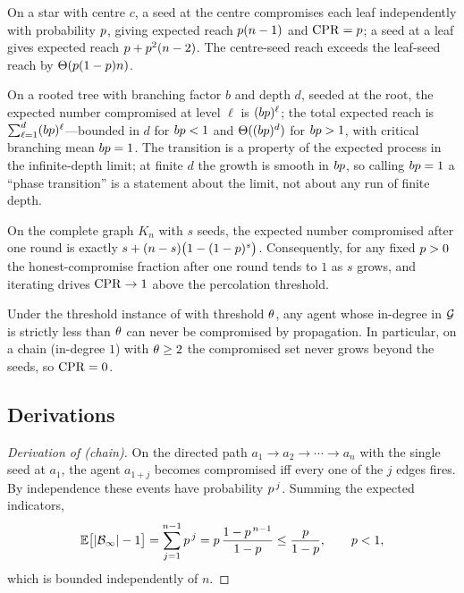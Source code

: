 \begin{proposition}\label{prop:star}
On a star with centre $c$, a seed at the centre compromises each leaf independently with
probability $p$, giving expected reach $p(n-1)$ and $\mathrm{CPR}=p$; a seed at a
leaf gives expected reach $p+p^{2}(n-2)$. The centre-seed reach exceeds the
leaf-seed reach by $\Theta(p(1-p)n)$.
\end{proposition}

\begin{proposition}\label{prop:tree}
On a rooted tree with branching factor $b$ and depth $d$, seeded at the root, the expected
number compromised at level $\ell$ is $(bp)^{\ell}$; the total expected reach is
$\sum_{\ell=1}^{d}(bp)^{\ell}$---bounded in $d$ for $bp<1$ and
$\Theta((bp)^{d})$ for $bp>1$, with critical branching mean $bp=1$. The
transition is a property of the expected process in the infinite-depth limit; at finite $d$
the growth is smooth in $bp$, so calling $bp=1$ a ``phase transition'' is a
statement about the limit, not about any run of finite depth.
\end{proposition}

\begin{proposition}\label{prop:mesh}
On the complete graph $K_n$ with $s$ seeds, the expected number compromised after one
round is exactly $s+(n-s)\bigl(1-(1-p)^{s}\bigr)$. Consequently, for any fixed
$p>0$ the honest-compromise fraction after one round tends to $1$ as $s$ grows, and
iterating drives $\mathrm{CPR}\to1$ above the percolation threshold.
\end{proposition}

\begin{corollary}\label{cor:threshold}
Under the threshold instance of  with threshold $\theta$, any agent whose
in-degree in $\mathcal{G}$ is strictly less than $\theta$ can never be compromised by
propagation. In particular, on a chain (in-degree $1$) with $\theta\ge2$ the compromised
set never grows beyond the seeds, so $\mathrm{CPR}=0$.
\end{corollary}

\subsection{Derivations}

\begin{proof}[Derivation of  (chain)]
On the directed path $a_1\to a_2\to\cdots\to a_n$ with the single seed at $a_1$, the agent
$a_{1+j}$ becomes compromised iff every one of the $j$ edges fires. By independence these
events have probability $p^{\,j}$. Summing the expected indicators,
\[
\mathbb{E}\bigl[|\mathcal{B}_\infty|-1\bigr]=\sum_{j=1}^{n-1}p^{\,j}
=p\,\frac{1-p^{\,n-1}}{1-p}\le \frac{p}{1-p},
\qquad p<1,
\]
which is bounded independently of $n$.
\end{proof}

